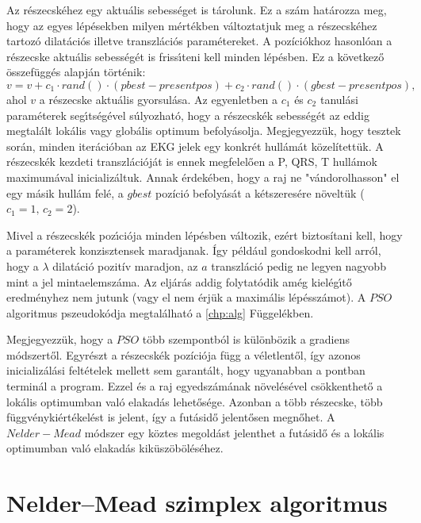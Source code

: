 \documentclass[oneside,titlepage,12pt,a4paper]{report}
\begin{document}
Az r\'eszecsk\'ehez egy aktu\'alis sebességet is tárolunk. Ez a sz\'am hat\'arozza meg, hogy az egyes
l\'ep\'esekben milyen m\'ert\'ekben v\'altoztatjuk meg a r\'eszecs\-k\'ehez tartoz\'o dilat\'aci\'os
illetve transzl\'aci\'os param\'etereket. A pozíciókhoz hasonlóan a r\'eszecske aktu\'alis
sebességét is friss\'\i teni kell minden lépésben. Ez a k\"ovetkez\H o \"osszef\"ugg\'es alapj\'an
t\"ort\'enik:
\begin{equation*}
v = v + c_1 \cdot rand() \cdot (pbest - presentpos) + c_2 \cdot rand() \cdot (gbest - presentpos),
\end{equation*}
ahol $v$ a r\'eszecske aktu\'alis gyorsul\'asa. Az egyenletben a $c_1$ \'es $c_2$ tanul\'asi param\'eterek seg\'\i ts\'eg\'evel s\'ulyozhat\'o, hogy a r\'eszecsk\'ek sebességét az eddig megtalált lokális vagy globális optimum befolyásolja. Megjegyezzük, hogy tesztek során, minden iterációban az EKG jelek egy konkrét hullámát közelítettük. A részecskék kezdeti transzlációját is ennek megfelelően a P, QRS, T hullámok maximumával inicializáltuk. Annak érdekében, hogy a raj ne "vándorolhasson" el egy másik hullám felé, a $gbest$ pozíció befolyását a kétszeresére növeltük ($c_1=1,\, c_2=2$).  

Mivel a r\'eszecsk\'ek poz\'\i ci\'oja minden lépésben változik, ezért biztosítani kell, hogy a paraméterek konzisztensek maradjanak. Így például gondoskodni kell arról, hogy a $\lambda$ dilatáció  pozitív maradjon, az $a$ transzláció pedig ne legyen nagyobb mint a jel mintaelemszáma.
Az elj\'ar\'as addig folytat\'odik am\'eg kiel\'eg\'\i t\H o eredm\'enyhez nem jutunk
(vagy el nem \'erj\"uk a maxim\'alis l\'ep\'essz\'amot). A $PSO$ algoritmus pszeudok\'odja 
megtal\'alhat\'o a \ref{chp:alg} F\"uggel\'ekben. 

Megjegyezzük, hogy a $PSO$ több szempontból is különbözik a gradiens módszertől. Egyrészt a részecskék pozíciója függ a véletlentől, így azonos inicializálási feltételek mellett sem garantált, hogy ugyanabban a pontban terminál a program. Ezzel és a raj egyedszámának növelésével csökkenthető a lokális optimumban való elakadás lehetősége. Azonban a több részecske, több függvénykiértékelést is jelent, így a futásidő jelentősen megnőhet. A $Nelder-Mead$ módszer egy köztes megoldást jelenthet a futásidő és a lokális optimumban való elakadás kiküszöböléséhez.   

\section{Nelder--Mead szimplex algoritmus}
\end{document}
